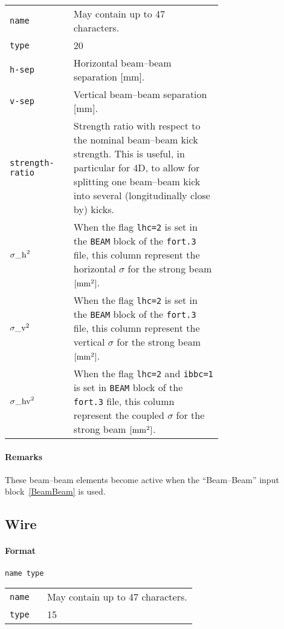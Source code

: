 \bigskip
\begin{longtabu}{@{}lp{0.7\linewidth}}
    \texttt{name}  & May contain up to 47 characters. \\
    \texttt{type}  & 20 \\
    \texttt{h-sep} & Horizontal beam--beam separation [mm]. \\
    \texttt{v-sep} & Vertical beam--beam separation [mm]. \\
    \texttt{strength-ratio} & Strength ratio with respect to the nominal beam--beam kick strength. This is useful, in particular for 4D, to allow for splitting one beam--beam kick into several (longitudinally close by) kicks. \\
    \texttt{${\sigma\_\rm{h}}^2$} & When the flag \texttt{lhc=2} is set in the \texttt{BEAM} block of the \texttt{fort.3} file, this column represent the horizontal $\sigma$ for the strong beam $\rm{[mm^2]}$. \\
    \texttt{${\sigma\_\rm{v}}^2$} & When the flag  \texttt{lhc=2} is set in the \texttt{BEAM} block of the \texttt{fort.3} file, this column represent the vertical $\sigma$ for the strong beam $\rm{[mm^2]}$. \\
    \texttt{${\sigma\_\rm{hv}}^2$} & When the flag  \texttt{lhc=2} and  \texttt{ibbc=1} is set in \texttt{BEAM} block of the \texttt{fort.3} file, this column represent the coupled $\sigma$ for the strong beam $\rm{[mm^2]}$. \\
\end{longtabu}

\paragraph{Remarks}
These beam--beam elements become active when the ``Beam--Beam'' input block~\ref{BeamBeam} is used.

\subsection{Wire} \label{WIRE}

\paragraph{Format} \texttt{name type}

\bigskip
\begin{tabular}{@{}lp{0.8\linewidth}}
    \texttt{name} & May contain up to 47 characters. \\
    \texttt{type} & 15
\end{tabular}

